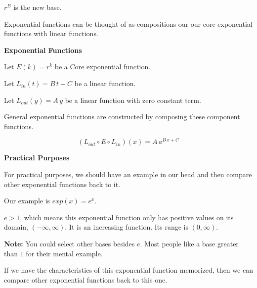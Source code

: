 \documentclass{ximera}
\begin{document}
$r^{B}$ is the new base.






Exponential functions can be thought of as compositions our our core exponential functions with linear functions.

\begin{idea} \textbf{\textcolor{blue!55!black}{Exponential Functions}}


Let $E(k) = r^k $ be a Core exponential function.

Let $L_{in}(t) = B \, t + C$ be a linear function.

Let $L_{out}(y) = A \, y$ be a linear function with zero constant term.


General exponential functions are constructed by composing these component functions.


\[
(L_{out} \circ E \circ L_{in})(x) = A \, a^{B \,x + C}
\]




\end{idea}




\begin{idea} \textbf{\textcolor{blue!55!black}{Practical Purposes}}


For practical purposes, we should have an example in our head and then compare other exponential functions back to it. 

Our example is  $exp(x) = e^x$. 


$e > 1$, which means this exponential function only has positive values on its domain, $(-\infty, \infty)$.  It is an increasing function. Its range is $(0, \infty)$.

\textbf{Note:} You could select other bases besides $e$.  Most people like a base greater than $1$ for their mental example.


\end{idea}

If we have the characteristics of this exponential function memorized, then we can compare other exponential functions back to this one.
\end{document}
